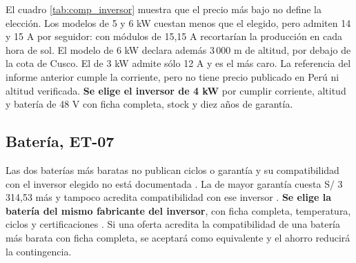El cuadro \ref{tab:comp_inversor} muestra que el precio más bajo no define la elección. Los modelos de 5 y 6 kW cuestan menos que el elegido, pero admiten 14 y 15 A por seguidor: con módulos de 15,15 A recortarían la producción en cada hora de sol. El modelo de 6 kW declara además 3\,000 m de altitud, por debajo de la cota de Cusco. El de 3 kW admite sólo 12 A y es el más caro. La referencia del informe anterior cumple la corriente, pero no tiene precio publicado en Perú ni altitud verificada. \textbf{Se elige el inversor de 4 kW} por cumplir corriente, altitud y batería de 48 V con ficha completa, stock y diez años de garantía.

\subsection{Batería, ET-07}
Las dos baterías más baratas no publican ciclos o garantía y su compatibilidad con el inversor elegido no está documentada \cite{suntaicbat,felicity}. La de mayor garantía cuesta S/ 3\,314,53 más y tampoco acredita compatibilidad con ese inversor \cite{sunperuus5000,pylonas,us5000manual}. \textbf{Se elige la batería del mismo fabricante del inversor}, con ficha completa, temperatura, ciclos y certificaciones \cite{tensitebat}. Si una oferta acredita la compatibilidad de una batería más barata con ficha completa, se aceptará como equivalente y el ahorro reducirá la contingencia.

